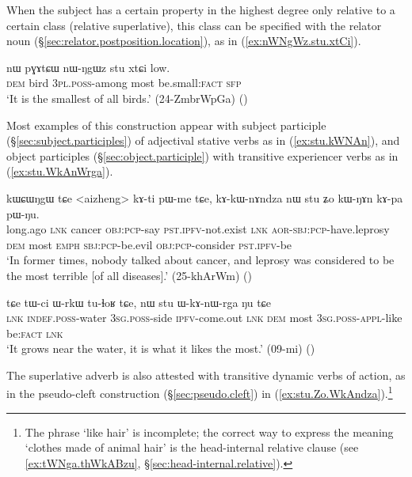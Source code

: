 When the subject has a certain property in the highest degree only relative to a certain class (relative superlative), this class can be specified with the relator noun  (§\ref{sec:relator.postposition.location}), as in  (\ref{ex:nWNgWz.stu.xtCi}).

 
\begin{exe}
\ex \label{ex:nWNgWz.stu.xtCi}
\gll nɯ pɣɤtɕɯ nɯ-ŋgɯz stu xtɕi low.\\
\textsc{dem} bird \textsc{3pl}.\textsc{poss}-among most be.small:\textsc{fact} \textsc{sfp} \\
\glt `It is the smallest of all birds.' (24-ZmbrWpGa)
()
\end{exe}

Most examples of this construction appear with subject participle (§\ref{sec:subject.participles}) of adjectival stative verbs as in (\ref{ex:stu.kWNAn}), and object participles (§\ref{sec:object.participle}) with transitive experiencer verbs as in (\ref{ex:stu.WkAnWrga}).

\begin{exe}
\ex \label{ex:stu.kWNAn}
\gll kɯɕɯŋgɯ tɕe <aizheng> kɤ-ti pɯ-me tɕe, kɤ-kɯ-nɤndza nɯ stu ʑo kɯ-ŋɤn kɤ-pa pɯ-ŋu.  \\
long.ago \textsc{lnk} cancer \textsc{obj}:\textsc{pcp}-say \textsc{pst}.\textsc{ipfv}-not.exist \textsc{lnk} \textsc{aor}-\textsc{sbj}:\textsc{pcp}-have.leprosy \textsc{dem} most \textsc{emph} \textsc{sbj}:\textsc{pcp}-be.evil \textsc{obj}:\textsc{pcp}-consider \textsc{pst}.\textsc{ipfv}-be \\
\glt `In former times, nobody talked about cancer, and leprosy was considered to be the most terrible [of all diseases].' (25-khArWm)
()
\end{exe}

\begin{exe}
\ex \label{ex:stu.WkAnWrga}
\gll tɕe tɯ-ci ɯ-rkɯ tu-ɬoʁ tɕe, nɯ stu ɯ-kɤ-nɯ-rga ŋu tɕe \\
\textsc{lnk} \textsc{indef}.\textsc{poss}-water \textsc{3sg}.\textsc{poss}-side \textsc{ipfv}-come.out \textsc{lnk} \textsc{dem} most \textsc{3sg}.\textsc{poss}-\textsc{appl}-like be:\textsc{fact} \textsc{lnk} \\
\glt `It grows near the water, it is what it likes the most.' (09-mi)
()
\end{exe}

The superlative adverb is also attested with transitive dynamic verbs of action, as in the pseudo-cleft construction (§\ref{sec:pseudo.cleft}) in (\ref{ex:stu.Zo.WkAndza}).\footnote{The phrase  `like hair' is incomplete; the correct way to express the meaning `clothes made of animal hair' is the head-internal relative clause  (see \ref{ex:tWNga.thWkABzu}, §\ref{sec:head-internal.relative}).} 

